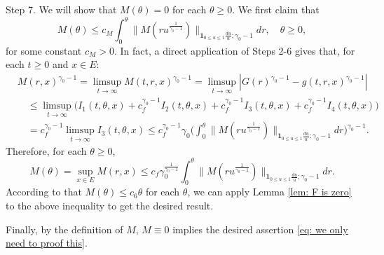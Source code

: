 \documentclass[12pt, a4paper]{amsart}
\theoremstyle{definition}
\numberwithin{equation}{section}
\begin{document}
	Step 7. We will show that $M(\theta) = 0$ for each $\theta \geq 0$.
	We first claim that
\begin{equation}
	M(\theta)
	\leq c_M\int_0^\theta  \big\| M(r u^{\frac{1}{\gamma_0 - 1}}) \big\|_{\mathbf 1_{0\leq u\leq 1}\frac{du}{u};\gamma_0 - 1}  dr ,
	\quad \theta \geq 0,
\end{equation}
	for some constant $c_M > 0$.
	In fact, a direct application of Steps 2-6 gives that, for each $t\geq 0$ and $x\in E$:
\begin{equation}\begin{split}
	&M(r,x)^{\gamma_0 - 1}
	=\limsup_{t\to \infty} M(t,r,x)^{\gamma_0 - 1}
	= \limsup_{t\to \infty}|G(r)^{\gamma_0 - 1} - g(t,r,x)^{\gamma_0 - 1}|
	\\&\quad \leq \limsup_{t\to \infty} \big( I_1(t,\theta,x) +c^{\gamma_0 - 1}_f I_2(t,\theta,x) +c^{\gamma_0 - 1}_f I_3(t,\theta,x) + c^{\gamma_0 - 1}_f I_4(t,\theta,x) \big)
	\\& \quad = c_f^{\gamma_0 - 1} \limsup_{t\to \infty} I_3(t,\theta ,x)
	\leq c_f^{\gamma_0 - 1} \gamma_0 \Big(  \int_0^\theta  \big\| M(r u^{\frac{1}{\gamma_0 - 1}}) \big\|_{\mathbf 1_{0\leq u\leq 1}\frac{du}{u};\gamma_0 - 1}  dr\Big)^{\gamma_0 - 1}.
\end{split}\end{equation}
	Therefore, for each $\theta \geq 0$,
\begin{equation}
	M(\theta)
	= \sup_{x\in E}  M(r,x)
	\leq c_f \gamma_0^{\frac{1}{\gamma_0 - 1}} \int_0^\theta  \big\| M(r u^{\frac{1}{\gamma_0 - 1}}) \big\|_{\mathbf 1_{0\leq u\leq 1}\frac{du}{u};\gamma_0 - 1}  dr.
\end{equation}
	According to that $M(\theta) \leq c_6 \theta$ for each $\theta$, we can apply Lemma \ref{lem: F is zero} to the above inequality to get the desired result.
	
	Finally, by the definition of $M$,  $M\equiv 0$ implies the desired assertion \eqref{eq: we only need to proof this}.
\end{document}
